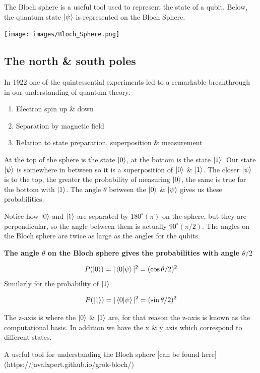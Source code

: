 \documentclass{book}
\begin{document}
The Bloch sphere is a useful tool used to represent the state of a qubit. Below, the quantum state $\ket{\psi}$ is represented on the Bloch Sphere. 

\texttt{[image: images/Bloch\_Sphere.png]}


\subsection{The north \& south poles}

In 1922 one of the quintessential experiments led to a remarkable breakthrough in our understanding of quantum theory. 

\begin{enumerate}
    \item Electron spin up \& down
    \item Separation by magnetic field
    \item Relation to state preparation, superposition \& measurement 
\end{enumerate}

At the top of the sphere  is the state $\ket{0}$, at the bottom is the state $\ket{1}$. Our state $\ket{\psi}$ is somewhere in between so it is a superposition of $\ket{0}$ \& $\ket{1}$. The closer $\ket{\psi}$  is to the top, the greater the probability of measuring $\ket{0}$, the same is true for the bottom with $\ket{1}$. The angle $\theta$ between the $\ket{0}$ \& $\ket{\psi}$ gives us these probabilities. 

Notice how $\ket{0}$ and $\ket{1}$ are separated by $180^{\circ} (\pi)$ on the sphere, but they are perpendicular, so the angle between them is actually $90 ^{\circ} (\pi/2)$. The angles on the Bloch sphere are twice as large as the angles for the qubits.

\textbf{The angle $\theta$ on the Bloch sphere gives the probabilities with angle $\theta/2$}

$$
P(\ket{0}) = |\braket{0|\psi}|^2 = (\cos{\theta/2})^2
$$
Similarly for the probability of $\ket{1}$

$$P(\ket{1}) = |\braket{0|\psi}|^2 = (\sin{\theta/2})^2$$

The z-axis is where the $\ket{0}$ \& $\ket{1}$ are, for that reason the z-axis is known as the computational basis. In addition we have the x \& y axis which correspond to different states. 

A useful tool for understanding the Bloch sphere [can be found here](https://javafxpert.github.io/grok-bloch/)
\end{document}
